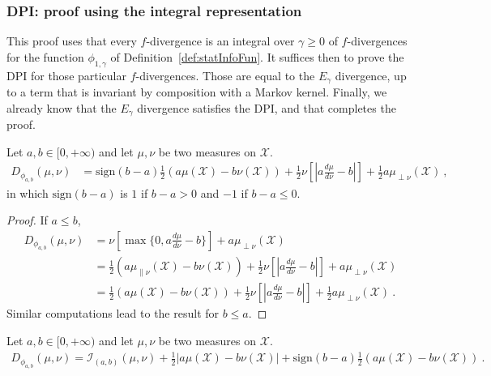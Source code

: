 \subsubsection{DPI: proof using the integral representation}

This proof uses that every $f$-divergence is an integral over $\gamma \ge 0$ of $f$-divergences for the function $\phi_{1,\gamma}$ of Definition~\ref{def:statInfoFun}. It suffices then to prove the DPI for those particular $f$-divergences. Those are equal to the $E_\gamma$ divergence, up to a term that is invariant by composition with a Markov kernel. Finally, we already know that the $E_\gamma$ divergence satisfies the DPI, and that completes the proof.

\begin{lemma}
  \label{lem:fDiv_statInfoFun_eq}
  \leanok
  Let $a,b \in [0, +\infty)$ and let $\mu, \nu$ be two measures on $\mathcal X$.
  \begin{align*}
  D_{\phi_{a,b}}(\mu, \nu)
  &= \text{sign}(b-a)\frac{1}{2}(a \mu(\mathcal X) - b \nu(\mathcal X)) + \frac{1}{2}\nu\left[ \left\vert a \frac{d\mu}{d\nu} - b \right\vert \right] + \frac{1}{2}a \mu_{\perp \nu}(\mathcal X)
  \: ,
  \end{align*}
  in which $\text{sign}(b-a)$ is $1$ if $b-a > 0$ and $-1$ if $b-a \le 0$.
\end{lemma}

\begin{proof}\leanok
\uses{}
If $a \le b$,
\begin{align*}
D_{\phi_{a,b}}(\mu, \nu)
&= \nu\left[ \max\{0, a \frac{d\mu}{d\nu} - b\} \right] + a \mu_{\perp \nu}(\mathcal X)
\\
&= \frac{1}{2}(a \mu_{\parallel \nu}(\mathcal X) - b \nu(\mathcal X)) + \frac{1}{2}\nu\left[ \left\vert a \frac{d\mu}{d\nu} - b \right\vert \right] + a \mu_{\perp \nu}(\mathcal X)
\\
&= \frac{1}{2}(a \mu(\mathcal X) - b \nu(\mathcal X)) + \frac{1}{2}\nu\left[ \left\vert a \frac{d\mu}{d\nu} - b \right\vert \right] + \frac{1}{2}a \mu_{\perp \nu}(\mathcal X)
\: . 
\end{align*}
Similar computations lead to the result for $b \le a$.
\end{proof}


\begin{corollary}
  \label{cor:fDiv_statInfoFun_eq_statInfo}
  \leanok
  Let $a,b \in [0, +\infty)$ and let $\mu, \nu$ be two measures on $\mathcal X$.
  \begin{align*}
  D_{\phi_{a,b}}(\mu, \nu) = \mathcal I_{(a,b)}(\mu, \nu) + \frac{1}{2} \left\vert a \mu(\mathcal X) - b \nu(\mathcal X) \right\vert + \text{sign}(b-a)\frac{1}{2}(a \mu(\mathcal X) - b \nu(\mathcal X))
  \: .
  \end{align*}
\end{corollary}

